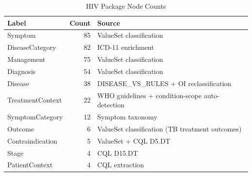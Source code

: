 \begin{table}[H]
\centering
\caption{HIV Package Node Counts}
\label{tab:hiv_nodes}
\begin{tabular}{l r l}
\hline
\textbf{Label} & \textbf{Count} & \textbf{Source} \\
\hline
Symptom & 85 & ValueSet classification \\
DiseaseCategory & 82 & ICD-11 enrichment \\
Management & 75 & ValueSet classification \\
Diagnosis & 54 & ValueSet classification \\
Disease & 38 & DISEASE\_VS\_RULES + OI reclassification \\
TreatmentContext & 22 & WHO guidelines + condition-scope auto-detection \\
SymptomCategory & 12 & Symptom taxonomy \\
Outcome & 6 & ValueSet classification (TB treatment outcomes) \\
Contraindication & 5 & ValueSet + CQL D5.DT \\
Stage & 4 & CQL D15.DT \\
PatientContext & 4 & CQL extraction \\
\hline
\end{tabular}
\end{table}

